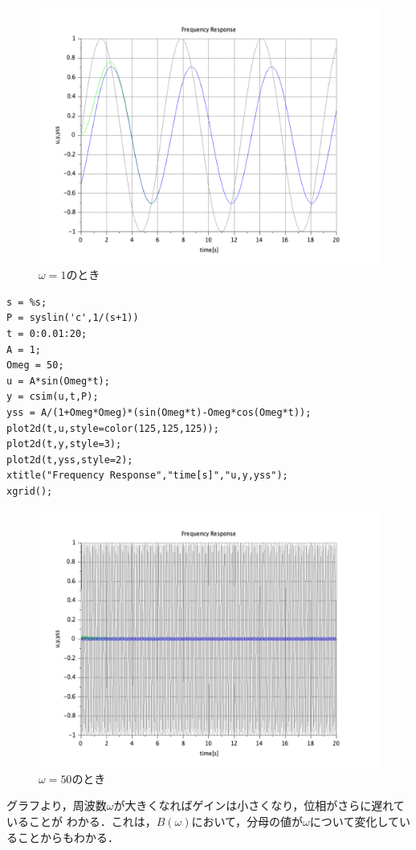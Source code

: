 \documentclass[a4paper,11pt]{jsarticle}
\begin{document}
\begin{enumerate}
\begin{figure}[H]
        \includegraphics[width=0.8\linewidth]{picture/3-1-1-1.png}
        \caption{$\omega=1$のとき}
        \label{3-1-1-1}
      \end{figure}

      \begin{lstlisting}[caption=図\ref{3-1-1-50}をプロットするコード, label=C:3-1-1-50]
s = %s;
P = syslin('c',1/(s+1))
t = 0:0.01:20;
A = 1;
Omeg = 50;
u = A*sin(Omeg*t);
y = csim(u,t,P);
yss = A/(1+Omeg*Omeg)*(sin(Omeg*t)-Omeg*cos(Omeg*t));
plot2d(t,u,style=color(125,125,125));
plot2d(t,y,style=3);
plot2d(t,yss,style=2);
xtitle("Frequency Response","time[s]","u,y,yss");
xgrid();
      \end{lstlisting}
      \begin{figure}[H]
        \centering
        \includegraphics[width=0.8\linewidth]{picture/3-1-1-50.png}
        \caption{$\omega = 50$のとき}
        \label{3-1-1-50}
      \end{figure}
      グラフより，周波数$\omega$が大きくなればゲインは小さくなり，位相がさらに遅れていることが
      わかる．これは，$B(\omega)$において，分母の値が$\omega$について変化していることからもわかる．
    \end{enumerate}
\end{document}
